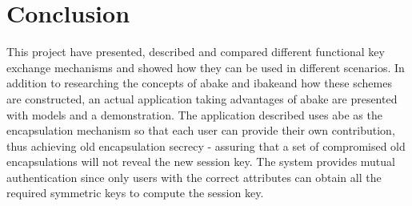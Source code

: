 \chapter{Conclusion}\label{cha:conclusion}
This project have presented, described and compared different functional key exchange mechanisms and showed how they can be used in different scenarios. In addition to researching the concepts of \gls{abake} and \gls{ibake}and how these schemes are constructed, an actual application taking advantages of \gls{abake} are presented with models and a demonstration. The application described uses \gls{abe} as the encapsulation mechanism so that each user can provide their own contribution, thus achieving old encapsulation secrecy - assuring that a set of compromised old encapsulations will not reveal the new session key. The system provides mutual authentication since only users with the correct attributes can obtain all the required symmetric keys to compute the session key. 

